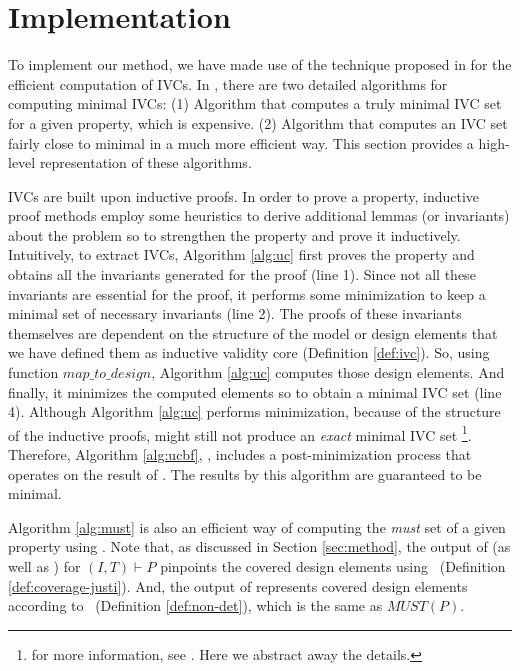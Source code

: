 \section{Implementation}
\label{sec:impl}

To implement our method, we have made use of the technique proposed in \cite{Ghass16} for the efficient computation of IVCs. In \cite{Ghass16}, there are two detailed algorithms for computing minimal IVCs: (1) Algorithm \ucbfalg that computes a truly minimal IVC set for a given property, which is expensive. (2) Algorithm \ucalg that computes an IVC set fairly close to minimal in a much more efficient way. This section provides a high-level representation of these algorithms.

IVCs are built upon inductive proofs. In order to prove a property, inductive proof methods employ some heuristics to derive additional lemmas (or invariants) about the problem so to strengthen the property and prove it inductively. Intuitively, to extract IVCs, Algorithm \ref{alg:uc}
first proves the property and obtains all the invariants generated for the proof (line 1). Since not all these invariants are essential for the proof, it performs some minimization to keep a minimal set of necessary invariants (line 2). The proofs of these invariants themselves are dependent on the structure of the model or design elements that we have defined them as inductive validity core (Definition \ref{def:ivc}).
So, using function $map\_to\_design$, Algorithm \ref{alg:uc}
computes those design elements. And finally, it minimizes the computed elements so to obtain a minimal IVC set (line 4). Although Algorithm \ref{alg:uc} performs minimization, because of the structure of the inductive proofs, \ucalg might still not produce an \emph{exact} minimal IVC set \footnote{for more information, see \cite{Ghass16}. Here we abstract away the details.}.
Therefore, Algorithm \ref{alg:ucbf}, \ucbfalg, includes a post-minimization process that
operates on the result of \ucalg. The results by this algorithm are guaranteed to be minimal.

Algorithm \ref{alg:must} is also an efficient way of computing the \emph{must} set of a given property using \ucalg. Note that, as discussed in Section \ref{sec:method}, the
output of \ucalg (as well as \ucbfalg) for $(I, T) \vdash P$ pinpoints the covered design elements
using \ivccov\ (Definition \ref{def:coverage-justi}).
And, the output of \mustalg represents covered design elements according to \nondetcov\ (Definition \ref{def:non-det}), which is the same as $MUST(P)$.

